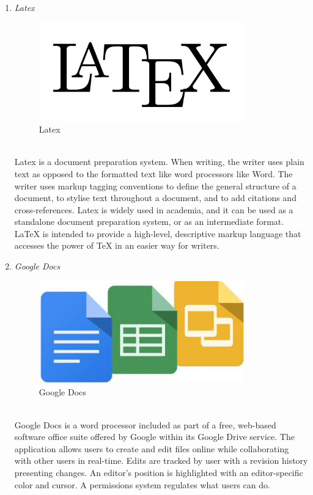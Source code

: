 \documentclass[conference]{IEEEtran}
\begin{document}
\begin{enumerate}
   \item \textit{Latex }
                   \begin{figure}[htbp]
    \centerline{\includegraphics[width=89mm, scale=0.5]{fig/latex.png}}
    \caption{Latex}
    \label{fig}
    \end{figure}
   \\Latex is a document preparation system. When writing, the writer uses plain text as opposed to the formatted text like word processors like Word. The writer uses markup tagging conventions to define the general structure of a document, to stylise text throughout a document, and to add citations and cross-references. Latex is widely used in academia, and it can be used as a standalone document preparation system, or as an intermediate format. LaTeX is intended to provide a high-level, descriptive markup language that accesses the power of TeX in an easier way for writers.\\
   \item \textit{Google Docs }
                   \begin{figure}[htbp]
    \centerline{\includegraphics[width=89mm, scale=0.5]{fig/google.jpg}}
    \caption{Google Docs}
    \label{fig}
    \end{figure}
   \\Google Docs is a word processor included as part of a free, web-based software office suite offered by Google within its Google Drive service. The application allows users to create and edit files online while collaborating with other users in real-time. Edits are tracked by user with a revision history presenting changes. An editor's position is highlighted with an editor-specific color and cursor. A permissions system regulates what users can do.\\


\end{enumerate}
\end{document}
